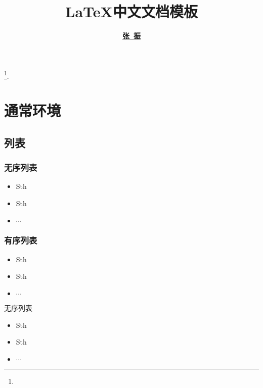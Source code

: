 \documentclass[a4paper, 12pt, UTF8]{ctexart}
\begin{document}
\title{\bf \LaTeX 中文文档模板}
\author{\bf
  \href{https://www.hustmatnoble.tk/2019/11/contact-me.html}{张\ 振}}
\date{}

\maketitle
\tableofcontents
\footnote{\noindent {} \newline
  \updatetext{\today}}.

\clearpage
\listoflistings

\clearpage

\section{通常环境}

\subsection{列表}

\subsubsection{无序列表}
\begin{itemize}
    \item Sth
    \item Sth
    \item $\cdots$
\end{itemize}
\subsubsection{有序列表}
\begin{itemize}
    \item[(1)] Sth
    \item[(2)] Sth
    \item[(3)] $\cdots$
\end{itemize}
\begin{mybox}{无序列表}
    \begin{itemize}[leftmargin = 10pt]
        \item Sth
        \item Sth
        \item $\cdots$
    \end{itemize}
\end{mybox}
\end{document}
